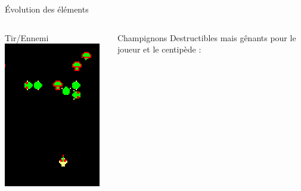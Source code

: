 \begin{frame}{Évolution des éléments}
\begin{columns}
\begin{column}{0.3\textwidth}
\begin{block}{Tir/Ennemi}
				\smallskip
				\includegraphics[width=\textwidth]{imgs/destructionSegment.png}
			\end{block}
		\end{column}
		\begin{column}{0.3\textwidth}
			\begin{block}{Champignons}
				Destructibles mais gênants pour le joueur et le centipède :
				

\end{block}
\end{column}
\end{columns}
\end{frame}
